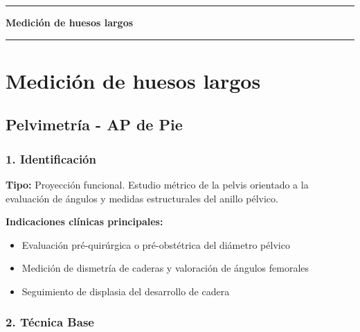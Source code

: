 \clearpage
\onecolumn
\thispagestyle{empty}
\vspace*{\fill}
\begin{center}
	{\color{radblue}\rule{\linewidth}{2pt}}\par
	\vspace{6mm}
	{\Huge\bfseries\color{radblue} Medición de huesos largos}\par
	\vspace{6mm}
	{\color{radblue}\rule{\linewidth}{2pt}}
\end{center}
\vspace*{\fill}
\clearpage
\twocolumn
\pagestyle{contenido}


	
	\section{Medición de huesos largos}
	
	\subsection{Pelvimetría - AP de Pie}
	
	\subsubsection*{1. Identificación}
	
	\textbf{Tipo:} Proyección funcional. Estudio métrico de la pelvis orientado a la evaluación de ángulos y medidas estructurales del anillo pélvico.
	
	\textbf{Indicaciones clínicas principales:}
	\begin{itemize}
		\item Evaluación pré-quirúrgica o pré-obstétrica del diámetro pélvico
		\item Medición de dismetría de caderas y valoración de ángulos femorales
		\item Seguimiento de displasia del desarrollo de cadera
	\end{itemize}
	
	\subsubsection*{2. Técnica Base}
	
